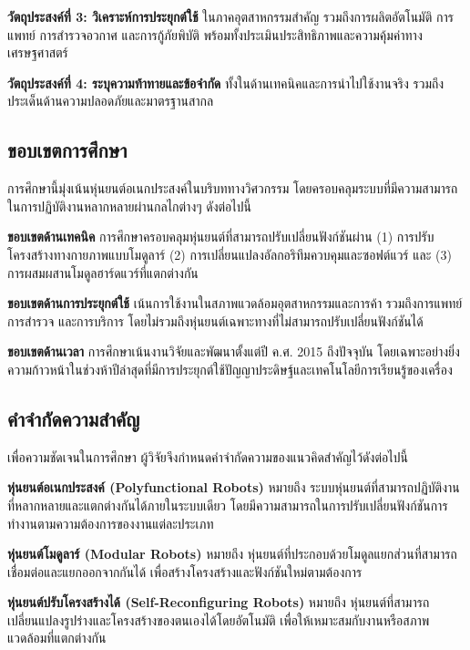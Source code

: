 \documentclass[a4paper]{article}
\begin{document}
\textbf{วัตถุประสงค์ที่ 3: วิเคราะห์การประยุกต์ใช้} ในภาคอุตสาหกรรมสำคัญ รวมถึงการผลิตอัตโนมัติ การแพทย์ การสำรวจอวกาศ และการกู้ภัยพิบัติ พร้อมทั้งประเมินประสิทธิภาพและความคุ้มค่าทางเศรษฐศาสตร์

\textbf{วัตถุประสงค์ที่ 4: ระบุความท้าทายและข้อจำกัด} ทั้งในด้านเทคนิคและการนำไปใช้งานจริง รวมถึงประเด็นด้านความปลอดภัยและมาตรฐานสากล \parencite{iso2025robotics}

\subsection{ขอบเขตการศึกษา}

การศึกษานี้มุ่งเน้นหุ่นยนต์อเนกประสงค์ในบริบททางวิศวกรรม โดยครอบคลุมระบบที่มีความสามารถในการปฏิบัติงานหลากหลายผ่านกลไกต่างๆ ดังต่อไปนี้

\textbf{ขอบเขตด้านเทคนิค} การศึกษาครอบคลุมหุ่นยนต์ที่สามารถปรับเปลี่ยนฟังก์ชันผ่าน (1) การปรับโครงสร้างทางกายภาพแบบโมดูลาร์ (2) การเปลี่ยนแปลงอัลกอริทึมควบคุมและซอฟต์แวร์ และ (3) การผสมผสานโมดูลฮาร์ดแวร์ที่แตกต่างกัน

\textbf{ขอบเขตด้านการประยุกต์ใช้} เน้นการใช้งานในสภาพแวดล้อมอุตสาหกรรมและการค้า รวมถึงการแพทย์ การสำรวจ และการบริการ โดยไม่รวมถึงหุ่นยนต์เฉพาะทางที่ไม่สามารถปรับเปลี่ยนฟังก์ชันได้

\textbf{ขอบเขตด้านเวลา} การศึกษาเน้นงานวิจัยและพัฒนาตั้งแต่ปี ค.ศ. 2015 ถึงปัจจุบัน โดยเฉพาะอย่างยิ่งความก้าวหน้าในช่วงห้าปีล่าสุดที่มีการประยุกต์ใช้ปัญญาประดิษฐ์และเทคโนโลยีการเรียนรู้ของเครื่อง

\subsection{คำจำกัดความสำคัญ}

เพื่อความชัดเจนในการศึกษา ผู้วิจัยจึงกำหนดคำจำกัดความของแนวคิดสำคัญไว้ดังต่อไปนี้

\textbf{หุ่นยนต์อเนกประสงค์ (Polyfunctional Robots)} หมายถึง ระบบหุ่นยนต์ที่สามารถปฏิบัติงานที่หลากหลายและแตกต่างกันได้ภายในระบบเดียว โดยมีความสามารถในการปรับเปลี่ยนฟังก์ชันการทำงานตามความต้องการของงานแต่ละประเภท

\textbf{หุ่นยนต์โมดูลาร์ (Modular Robots)} หมายถึง หุ่นยนต์ที่ประกอบด้วยโมดูลแยกส่วนที่สามารถเชื่อมต่อและแยกออกจากกันได้ เพื่อสร้างโครงสร้างและฟังก์ชันใหม่ตามต้องการ \parencite{bi2016survey}

\textbf{หุ่นยนต์ปรับโครงสร้างได้ (Self-Reconfiguring Robots)} หมายถึง หุ่นยนต์ที่สามารถเปลี่ยนแปลงรูปร่างและโครงสร้างของตนเองได้โดยอัตโนมัติ เพื่อให้เหมาะสมกับงานหรือสภาพแวดล้อมที่แตกต่างกัน \parencite{hameed2017modular}
\end{document}
